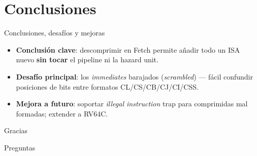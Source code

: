 \documentclass{beamer}
\begin{document}
\section{Conclusiones}

\begin{frame}{Conclusiones, desafíos y mejoras}
  \begin{itemize}
    \item<1-> \textbf{Conclusión clave}: descomprimir en Fetch permite añadir
      todo un ISA nuevo \textbf{sin tocar} el pipeline ni la hazard unit.
    \item<2-> \textbf{Desafío principal}: los \textit{immediates} barajados
      (\textit{scrambled}) --- fácil confundir posiciones de bits entre
      formatos CL/CS/CB/CJ/CI/CSS.
    \item<3-> \textbf{Mejora a futuro}: soportar \textit{illegal instruction}
      trap para comprimidas mal formadas; extender a RV64C.
  \end{itemize}
\end{frame}

\begin{frame}
  \centering
  \Huge Gracias
  \vspace{1cm}

  \normalsize Preguntas
\end{frame}
\end{document}
